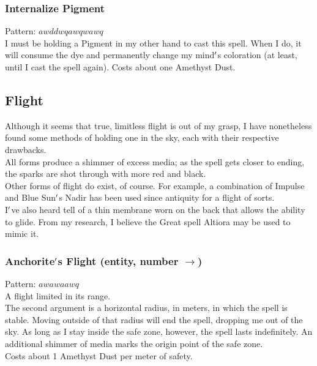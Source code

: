 \documentclass[12pt]{article}
\begin{document}
  \label{sec: patterns/spells/colorize@hexcasting:colorize}
\subsubsection*{Internalize Pigment}

    Pattern: $awddwqawqwawq$\\
      I must be holding a Pigment in my other hand to cast this spell. When I do, it will consume the dye and permanently change my mind$\rq$s coloration (at least, until I cast the spell again). Costs about one Amethyst Dust.\\

\newpage

\label{sec:patterns/spells/flight}
\subsection*{Flight}


  
    Although it seems that true, limitless flight is out of my grasp, I have nonetheless found some methods of holding one in the sky, each with their respective drawbacks.\\All forms produce a shimmer of excess media; as the spell gets closer to ending, the sparks are shot through with more red and black.\\


  
    Other forms of flight do exist, of course. For example, a combination of Impulse and Blue Sun$\rq$s Nadir has been used since antiquity for a flight of sorts.\\I$\rq$ve also heard tell of a thin membrane worn on the back that allows the ability to glide. From my research, I believe the Great spell Altiora may be used to mimic it.\\


  \label{sec: patterns/spells/flight@hexcasting:flight/range}
\subsubsection*{Anchorite$\rq$s Flight (entity, number $\rightarrow$)}

    Pattern: $awawaawq$\\
      A flight limited in its range.\\


  
    The second argument is a horizontal radius, in meters, in which the spell is stable. Moving outside of that radius will end the spell, dropping me out of the sky. As long as I stay inside the safe zone, however, the spell lasts indefinitely. An additional shimmer of media marks the origin point of the safe zone. \\Costs about 1 Amethyst Dust per meter of safety.\\
\end{document}
